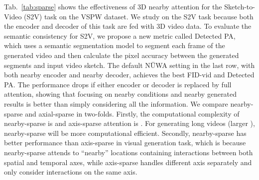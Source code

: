 \documentclass[10pt,twocolumn,letterpaper]{article}
\begin{document}
Tab.~\ref{tab:sparse} shows the effectiveness of 3D nearby attention for the Sketch-to-Video (S2V) task on the VSPW\cite{miaoVSPWLargescaleDataset2021} dataset. We study on the S2V task because both the encoder and decoder of this task are fed with 3D video data. To evaluate the semantic consistency for S2V, we propose a new metric called Detected PA, which uses a semantic segmentation model\cite{yuanObjectcontextualRepresentationsSemantic2020} to segment each frame of the generated video and then calculate the pixel accuracy between the generated segments and input video sketch. The default NÜWA setting in the last row, with both nearby encoder and nearby decoder, achieves the best FID-vid and Detected PA. The performance drops if either encoder or decoder is replaced by full attention, showing that focusing on nearby conditions and nearby generated results is better than simply considering all the information.
We compare nearby-sparse and axial-sparse in two-folds. Firstly, the computational complexity of nearby-sparse is  and axis-sparse attention is . For generating long videos (larger ), nearby-sparse will be more computational efficient. Secondly, nearby-sparse has better performance than axis-sparse in visual generation task, which is because nearby-sparse attends to ``nearby'' locations containing interactions between both spatial and temporal axes, while axis-sparse handles different axis separately and only consider interactions on the same axis. 
\end{document}
